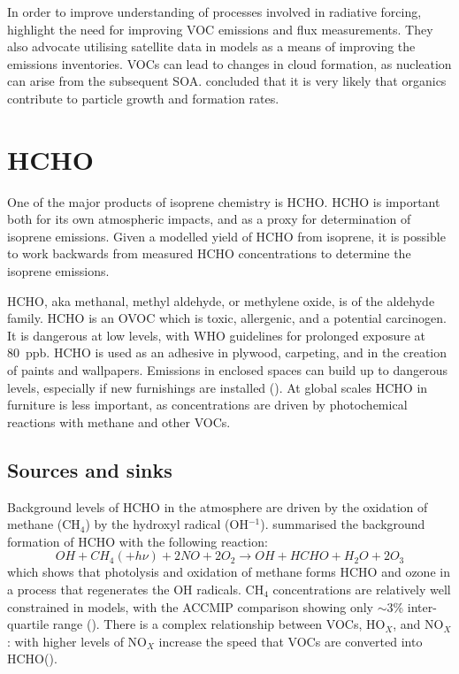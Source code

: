     In order to improve understanding of processes involved in radiative forcing, \cite{Kanakidou2005} highlight the need for improving VOC emissions and flux measurements.
    They also advocate utilising satellite data in models as a means of improving the emissions inventories.
    VOCs can lead to changes in cloud formation, as nucleation can arise from the subsequent SOA.
    \cite{Kanakidou2005} concluded that it is very likely that organics contribute to particle growth and formation rates.
    
\section{HCHO}
\label{LR:HCHO}

  One of the major products of isoprene chemistry is HCHO.
  HCHO is important both for its own atmospheric impacts, and as a proxy for determination of isoprene emissions.
  Given a modelled yield of HCHO from isoprene, it is possible to work backwards from measured HCHO concentrations to determine the isoprene emissions.

  HCHO, aka methanal, methyl aldehyde, or methylene oxide, is of the aldehyde family.
  HCHO is an OVOC which is toxic, allergenic, and a potential carcinogen. 
  It is dangerous at low levels, with WHO guidelines for prolonged exposure at 80~ppb.
  HCHO is used as an adhesive in plywood, carpeting, and in the creation of paints and wallpapers.
  Emissions in enclosed spaces can build up to dangerous levels, especially if new furnishings are installed (\cite{Davenport2015}).
  At global scales HCHO in furniture is less important, as concentrations are driven by photochemical reactions with methane and other VOCs.
  
  \subsection{Sources and sinks}
    \label{LR:HCHO:Sources}
     
    Background levels of HCHO in the atmosphere are driven by the oxidation of methane (CH$_4$) by the hydroxyl radical (OH$^{-1}$).
    \cite{Atkinson2000} summarised the background formation of HCHO with the following reaction:
    \begin{equation*} \label{LR:HCHO:Sources:eqn_MethaneBackground}
      OH + CH_4 (+ h\nu) + 2NO + 2O_2 \rightarrow OH + HCHO + H_2O + 2O_3
    \end{equation*}
    which shows that photolysis and oxidation of methane forms HCHO and ozone in a process that regenerates the OH radicals.
    CH$_4$ concentrations are relatively well constrained in models, with the ACCMIP comparison showing only $\sim3$\% inter-quartile range (\cite{Young2013}).
    There is a complex relationship between VOCs, HO$_X$, and NO$_X$: with higher levels of NO$_X$ increase the speed that VOCs are converted into HCHO(\cite{Wolfe2016}).
    

